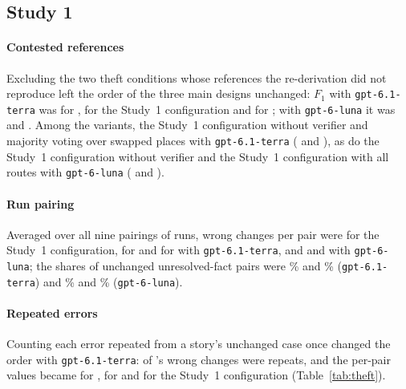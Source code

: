\subsection{Study 1}
\label{app:rob-study1}

\paragraph{Contested references}
Excluding the two theft conditions whose references the re-derivation did not reproduce left the order of the three main designs unchanged: $F_1$ with \texttt{gpt-6.1-terra} was \thTerraRAgreedFone{} for , \thTerraCPAgreedFone{} for the Study~1 configuration and \thTerraDAgreedFone{} for ; with \texttt{gpt-6-luna} it was \thLunaRAgreedFone{} and \thLunaCPAgreedFone. Among the variants, the Study~1 configuration without verifier and majority voting over  swapped places with \texttt{gpt-6.1-terra} (\thTerraCPnAgreedFone{} and \thTerraDscAgreedFone), as do the Study~1 configuration without verifier and the Study~1 configuration with all routes with \texttt{gpt-6-luna} (\thLunaCPnAgreedFone{} and \thLunaCPallAgreedFone).

\paragraph{Run pairing}
Averaged over all nine pairings of runs, wrong changes per pair were \thTerraCPAllPairWrongPP{} for the Study~1 configuration, \thTerraRAllPairWrongPP{} for  and \thTerraDAllPairWrongPP{} for  with \texttt{gpt-6.1-terra}, and \thLunaCPAllPairWrongPP{} and \thLunaRAllPairWrongPP{} with \texttt{gpt-6-luna}; the shares of unchanged unresolved-fact pairs were \thTerraCPAllPairStable\% and \thTerraRAllPairStable\% (\texttt{gpt-6.1-terra}) and \thLunaCPAllPairStable\% and \thLunaRAllPairStable\% (\texttt{gpt-6-luna}).

\paragraph{Repeated errors}
Counting each error repeated from a story's unchanged case once changed the order with \texttt{gpt-6.1-terra}: \thTerraDWrongInShared{} of 's \thTerraDWrong{} wrong changes were repeats, and the per-pair values became \thTerraDDedupWrongPP{} for , \thTerraRDedupWrongPP{} for  and \thTerraCPDedupWrongPP{} for the Study~1 configuration (Table~\ref{tab:theft}).

